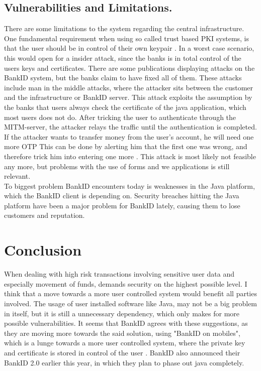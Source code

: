 \documentclass[a4paper,11pt]{article}
\begin{document}
\subsection{Vulnerabilities and Limitations.}
There are some limitations to the system regarding the central infrastructure. One fundamental requirement when using so called trust based PKI systems, is that the user should be in control of their own keypair \cite{digsig}. In a worst case scenario, this would open for a insider attack, since the banks is in total control of the users keys and certificates. There are some publications displaying attacks on the BankID system, but the banks claim to have fixed all of them. These attacks include man in the middle attacks, where the attacker sits between the customer and the infrastructure or BankID server. This attack exploits the assumption by the banks that users always check the certificate of the java application, which most users does not do. After tricking the user to authenticate through the MITM-server, the attacker relays the traffic until the authentication is completed. If the attacker wants to transfer money from the user's account, he will need one more OTP This can be done by alerting him that the first one was wrong, and therefore trick him into entering one more \cite{attack1}. This attack is most likely not feasible any more, but problems with the use of forms and we applications is still relevant. \\    
To biggest problem BankID encounters today is weaknesses in the Java platform, which the BankID client is depending on. Security breaches hitting the Java platform have been a major problem for BankID lately, causing them to lose customers and reputation. 





\section{Conclusion}
When dealing with high risk transactions involving sensitive user data and especially movement of funds, demands security on the highest possible level. I think that a move towards a more user controlled system would benefit all parties involved. The usage of user installed software like Java, may not be a big problem in itself, but it is still a unnecessary dependency, which only makes for more possible vulnerabilities.
It seems that BankID agrees with these suggestions, as they are moving more towards the said solution, using "BankID on mobiles", which is a lunge towards a more user controlled system, where the private key and certificate is stored in control of the user \cite{bankidmobil2}. BankID also announced their BankID 2.0 \cite{bankid2} earlier this year, in which they plan to phase out java completely. \\
\end{document}
